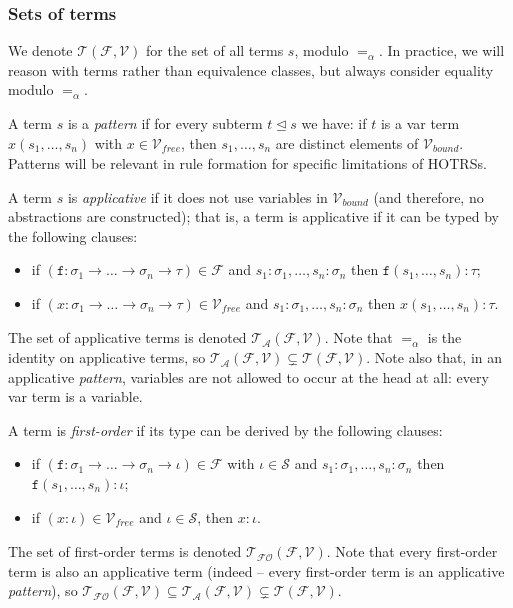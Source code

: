 \documentclass{lmcs}
\theoremstyle{theorem}\newtheorem{theorem}{Theorem}
\theoremstyle{theorem}\newtheorem{lemma}[theorem]{Lemma}
\theoremstyle{theorem}\newtheorem{corollary}[theorem]{Corollary}
\theoremstyle{definition}\newtheorem{definition}[theorem]{Definition}
\theoremstyle{definition}\newtheorem{example}[theorem]{Example}
\newcommand{\F}{\mathcal{F}}
\newcommand{\V}{\mathcal{V}}
\newcommand{\Vfree}{\mathcal{V}_{\mathit{free}}}
\newcommand{\Vbound}{\mathcal{V}_{\mathit{bound}}}
\newcommand{\Sorts}{\mathcal{S}}
\newcommand{\Terms}{\mathcal{T}}
\newcommand{\ATerms}{\mathcal{T}_{\mathcal{A}}}
\newcommand{\FOTerms}{\mathcal{T}_{\mathcal{FO}}}
\newcommand{\asort}{\iota}
\newcommand{\atype}{\sigma}
\newcommand{\btype}{\tau}
\newcommand{\identifier}[1]{\mathtt{#1}}
\newcommand{\afun}{\identifier{f}}
\newcommand{\avar}{x}
\newcommand{\arrtype}{\rightarrow}
\newcommand{\subtermeq}{\unlhd}
\newcommand{\mysubsection}[1]{\vspace{-12pt}\subsubsection{#1}}
\begin{document}
\mysubsection{Sets of terms}

We denote $\Terms(\F,\V)$ for the set of all terms $s$, modulo $=_\alpha$.  In practice, we will
reason with terms rather than equivalence classes, but always consider equality modulo $=_\alpha$.

A term $s$ is a \emph{pattern} if for every subterm $t \subtermeq s$ we have: if $t$ is a var term
$x(s_1,\dots,s_n)$ with $x \in \Vfree$, then $s_1,\dots,s_n$ are distinct elements of $\Vbound$.
Patterns will be relevant in rule formation for specific limitations of HOTRSs.

A term $s$ is \emph{applicative} if it does not use variables in $\Vbound$ (and therefore, no
abstractions are constructed); that is, a term is applicative if it can be typed by the
following clauses:
\begin{itemize}
\item if $(\afun : \atype_1 \arrtype \dots \arrtype \atype_n \arrtype \btype) \in \F$ and
  $s_1 : \atype_1,\dots,s_n : \atype_n$ then $\afun(s_1,\dots,s_n) : \btype$;
\item if $(\avar : \atype_1 \arrtype \dots \arrtype \atype_n \arrtype \btype) \in \Vfree$ and
  $s_1 : \atype_1,\dots,s_n : \atype_n$ then $\avar(s_1,\dots,s_n) : \btype$.
\end{itemize}
The set of applicative terms is denoted $\ATerms(\F,\V)$.  Note that $=_\alpha$ is the
identity on applicative terms, so $\ATerms(\F,\V) \subsetneq \Terms(\F,\V)$.
Note also that, in an applicative \emph{pattern}, variables are not allowed to occur at the head
at all: every var term is a variable.

A term is \emph{first-order} if its type can be derived by the following clauses:
\begin{itemize}
\item if $(\afun : \atype_1 \arrtype \dots \arrtype \atype_n \arrtype \asort) \in \F$ with $\asort
  \in \Sorts$ and
  $s_1 : \atype_1,\dots,s_n : \atype_n$ then $\afun(s_1,\dots,s_n) : \asort$;
\item if $(\avar : \asort) \in \Vfree$ and $\asort \in \Sorts$, then $\avar : \asort$.
\end{itemize}
The set of first-order terms is denoted $\FOTerms(\F,\V)$.  Note that every first-order term is
also an applicative term (indeed -- every first-order term is an applicative \emph{pattern}),
so $\FOTerms(\F,\V) \subseteq \ATerms(\F,\V) \subsetneq \Terms(\F,\V)$.
\end{document}
